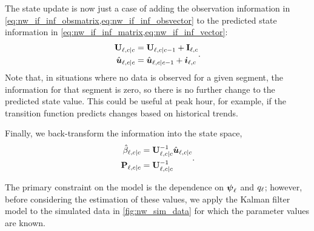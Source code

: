 The state update is now just a case of adding the observation information in \cref{eq:nw_if_inf_obsmatrix,eq:nw_if_inf_obsvector} to the predicted state information in \cref{eq:nw_if_inf_matrix,eq:nw_if_inf_vector}:
\begin{equation}
\label{eq:nw_if_update}
\begin{split}
\mathbf{U}_{\ell,c|c} &= \mathbf{U}_{\ell,c|c-1} + \mathbf{I}_{\ell,c} \\
\hat{\boldsymbol{u}}_{\ell,c|c} &= \hat{\boldsymbol{u}}_{\ell,c|c-1} + \boldsymbol{i}_{\ell,c}
\end{split}.
\end{equation}
Note that, in situations where no data is observed for a given segment, the information for that segment is zero, so there is no further change to the predicted state value. This could be useful at peak hour, for example, if the transition function predicts changes based on historical trends.


Finally, we back-transform the information into the state space,
\begin{equation}
\label{eq:nw_if_statespace}
\begin{split}
\hat{\beta}_{\ell,c|c} &= \mathbf{U}_{\ell,c|c}^{-1} \hat{\boldsymbol{u}}_{\ell,c|c} \\
\mathbf{P}_{\ell,c|c} &= \mathbf{U}_{\ell,c|c}^{-1}
\end{split}.
\end{equation}

The primary constraint on the model is the dependence on $\mathbf{\boldsymbol{\psi}}_{\ell}$ and $q_{\ell}$; however, before considering the estimation of these values, we apply the Kalman filter model to the simulated data in \cref{fig:nw_sim_data} for which the parameter values are known.


